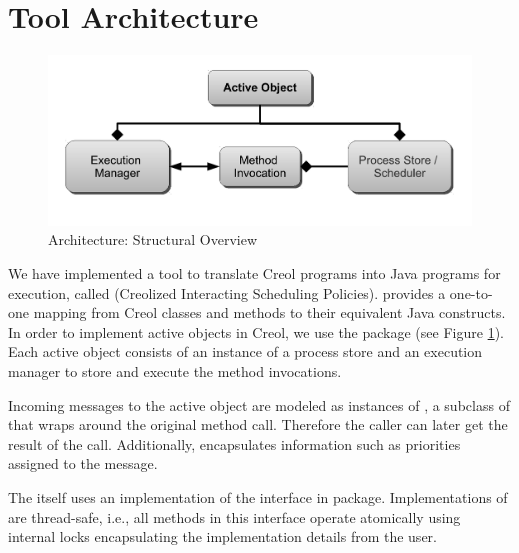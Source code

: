 

\section{Tool Architecture} \label{sec:compiler}


\begin{figure}[t]
\begin{center}
  \includegraphics[scale=0.36]{figs/manticore-concurrency-v4}
  \caption{\Crisp Architecture: Structural Overview}
  \label{fig:api}
\end{center}
\end{figure}

We have implemented a tool to translate Creol programs into Java programs for execution, called {\em \Crisp} (Creolized Interacting Scheduling Policies).
\Crisp provides a one-to-one mapping from Creol classes and methods to their equivalent Java constructs. 
In order to implement active objects in Creol, we use the  package (see Figure \ref{fig:api}).
Each active object consists of an instance of a process store  and an execution manager to store and execute the method invocations. 

Incoming messages to the active object are modeled as instances of \MethodInvocation, a subclass of  that  wraps around the original method call.
Therefore the caller can later get the result of the call.
Additionally, \MethodInvocation encapsulates information such as priorities assigned to the message. 

The  itself uses an implementation of the  interface in  package. Implementations of  are thread-safe, i.e.,  all methods in this interface operate atomically using internal locks encapsulating the implementation details from the user. 

